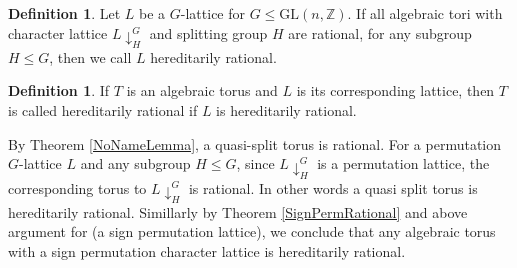 \documentclass[a4paper, 14pt]{extarticle}
\theoremstyle{plain}
\theoremstyle{definition}
\newtheorem{definition}[theorem]{Definition}
\newcommand{\Z}{\ensuremath{\mathbb{Z}}}
\begin{document}
\begin{definition}
Let $L$ be a $G$-lattice for $G\leq \mathrm{GL}(n,\Z)$. If all algebraic tori with 
character lattice $L\downarrow_H^G$ and splitting group $H$ are rational, for any 
subgroup $H \leq G$, then we call $L$ hereditarily rational. 
\end{definition} 
\begin{definition}
If $T$ is an algebraic torus and $L$ is its corresponding lattice, then $T$ is called 
hereditarily rational if $L$ is hereditarily rational.
\end{definition}
\noindent
By Theorem \ref{NoNameLemma}, a quasi-split torus is rational. For a permutation 
$G$-lattice $L$ and any subgroup $H\leq G$, since $L\downarrow_H^G$ is a permutation 
lattice, the corresponding torus to $L\downarrow_H^G$ is rational. In other words a 
quasi split torus is hereditarily rational. Simillarly by Theorem \ref{SignPermRational} 
and above argument for (a sign permutation lattice), we conclude that any algebraic 
torus with a sign permutation character lattice is hereditarily rational. \\ \\
\end{document}
